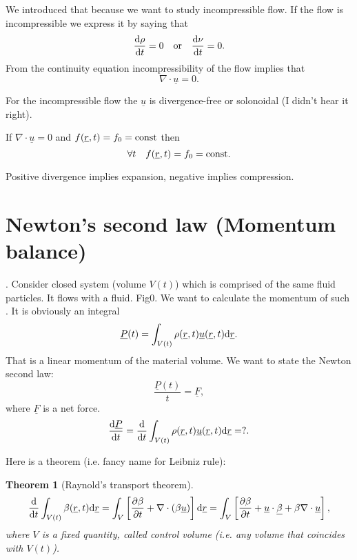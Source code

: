 \documentclass[11pt,oneside]{book}
\renewcommand{\vec}[1]{\underline{#1}}
\theoremstyle{definition} %
\theoremstyle{plain} %
\newtheorem{theorem}{Theorem}[section]
\theoremstyle{remark} %
\theoremstyle{underline}
\begin{document}
  We introduced that because we want to study incompressible flow.
  If the flow is incompressible we express it by saying that
  \begin{displaymath}
    \frac{\mathrm{d} \rho}{\mathrm{d} t} = 0 \quad \textrm{or}\quad  \frac{\mathrm{d} \nu}{\mathrm{d} t} = 0.
  \end{displaymath}
  From the continuity equation incompressibility of the flow implies that
  \begin{displaymath}
    \nabla \cdot \vec u = 0.
  \end{displaymath}
  
  For the incompressible flow the $\vec u$ is divergence-free or solonoidal (\todo I didn't hear it right).

  If $\nabla \cdot \vec u = 0$ and $ f(\vec r, t) = f_0 = \tm{const}$ then
  \begin{displaymath}
    \forall t \quad f(\vec r, t) = f_0 = \tm{const}.
  \end{displaymath}

  Positive divergence implies expansion, negative implies compression.
  

  \section{Newton's second law (Momentum balance)}
  . Consider closed system (volume $V(t)$) which is comprised of the same fluid particles.
  It flows with a fluid. \todo Fig0.
  We want to calculate the momentum of such .
  It is obviously an integral
  \begin{displaymath}
    \vec P (t) = \int_{V(t)} \rho(\vec r, t) \vec u(\vec r, t) \d \vec r.
  \end{displaymath}
  That is a linear momentum of the material volume.
  We want to state the Newton second law:
  \begin{displaymath}
    \dfrac{\vec P(t)}{t} = \vec F, 
  \end{displaymath}
  where $\vec F$ is a net force.
  \begin{displaymath}
    \dfrac{\vec P}{t} = \dfrac{}{t} \int_{V(t)} \rho(\vec r, t) \vec u (\vec r, t) \d \vec r = ?.
  \end{displaymath}
  
  Here is a theorem (i.e. fancy name for Leibniz rule):
  
  \begin{theorem}[Raynold's transport theorem]
    \begin{displaymath}
      \dfrac{}{t} \int_{V(t)} \beta (\vec r, t) \d \vec r = 
      \int_{V}\left[ \ptf{\beta}{t} + \nabla \cdot (\beta \vec u) \right] \d \vec r
      = \int_V \left[ \ptf{\beta}{t} + \vec u \cdot \vec \beta + \beta \nabla \cdot \vec u \right]
      ,
    \end{displaymath}
    where $V$ is a fixed quantity, called control volume (i.e. any volume that coincides with $V(t)$).
  \end{theorem}
\end{document}
